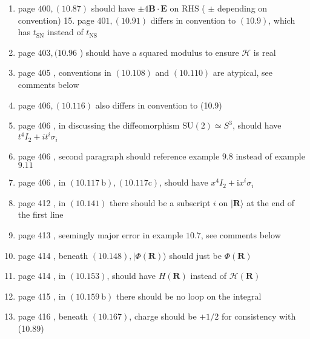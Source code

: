 \documentclass{article}
\begin{document}
\begin{enumerate}
\item page $400,(10.87)$ should have $\pm 4 \mathbf{B} \cdot \mathbf{E}$ on $\mathrm{RHS}$ ( $\pm$ depending on convention) 15. page $401,(10.91)$ differs in convention to $(10.9)$, which has $t_{\mathrm{SN}}$ instead of $t_{\mathrm{NS}}$

\item page $403,(10.96$ ) should have a squared modulus to ensure $\mathcal{H}$ is real

\item page 405 , conventions in $(10.108)$ and $(10.110)$ are atypical, see comments below

\item page $406,(10.116)$ also differs in convention to (10.9)

\item page 406 , in discussing the diffeomorphism $\mathrm{SU}(2) \simeq S^{3}$, should have $t^{4} I_{2}+i t^{i} \sigma_{i}$

\item page 406 , second paragraph should reference example $9.8$ instead of example $9.11$

\item page 406 , in $(10.117 \mathrm{~b}),(10.117 \mathrm{c})$, should have $x^{4} I_{2}+\mathrm{i} x^{i} \sigma_{i}$

\item page 412 , in $(10.141)$ there should be a subscript $i$ on $|\mathbf{R}\rangle$ at the end of the first line

\item page 413 , seemingly major error in example $10.7$, see comments below

\item page 414 , beneath $(10.148),|\Phi(\mathbf{R})\rangle$ should just be $\Phi(\mathbf{R})$

\item page 414 , in $(10.153)$, should have $H(\mathbf{R})$ instead of $\mathcal{H}(\mathbf{R})$

\item page 415 , in $(10.159 \mathrm{~b})$ there should be no loop on the integral

\item page 416 , beneath $(10.167)$, charge should be $+1 / 2$ for consistency with (10.89)
\end{enumerate}
\end{document}
